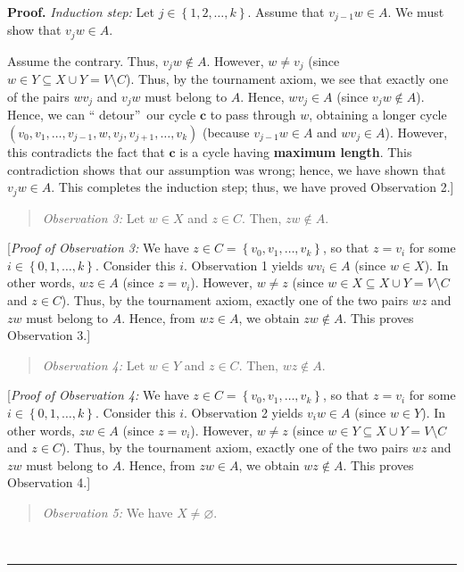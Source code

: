 \documentclass[numbers=enddot,12pt,final,onecolumn,notitlepage]{scrartcl}%
\numberwithin{exer}{subsection}
\theoremstyle{definition}
\newenvironment{statement}{\begin{quote}}{\end{quote}}
\newenvironment{proof}[1][Proof]{\noindent\textbf{#1.} }{\ \rule{0.5em}{0.5em}}
\begin{document}
\begin{proof}
\textit{Induction step:} Let $j\in\left\{  1,2,\ldots,k\right\}  $. Assume
that $v_{j-1}w\in A$. We must show that $v_{j}w\in A$.

Assume the contrary. Thus, $v_{j}w\notin A$. However, $w\neq v_{j}$ (since
$w\in Y\subseteq X\cup Y=V\setminus C$). Thus, by the tournament axiom, we see
that exactly one of the pairs $wv_{j}$ and $v_{j}w$ must belong to $A$. Hence,
$wv_{j}\in A$ (since $v_{j}w\notin A$). Hence, we can \textquotedblleft
detour\textquotedblright\ our cycle $\mathbf{c}$ to pass through $w$,
obtaining a longer cycle $\left(  v_{0},v_{1},\ldots,v_{j-1},w,v_{j}%
,v_{j+1},\ldots,v_{k}\right)  $ (because $v_{j-1}w\in A$ and $wv_{j}\in A$).
However, this contradicts the fact that $\mathbf{c}$ is a cycle having
\textbf{maximum length}. This contradiction shows that our assumption was
wrong; hence, we have shown that $v_{j}w\in A$. This completes the induction
step; thus, we have proved Observation 2.]

\begin{statement}
\textit{Observation 3:} Let $w\in X$ and $z\in C$. Then, $zw\notin A$.
\end{statement}

[\textit{Proof of Observation 3:} We have $z\in C=\left\{  v_{0},v_{1}%
,\ldots,v_{k}\right\}  $, so that $z=v_{i}$ for some $i\in\left\{
0,1,\ldots,k\right\}  $. Consider this $i$. Observation 1 yields $wv_{i}\in A$
(since $w\in X$). In other words, $wz\in A$ (since $z=v_{i}$). However, $w\neq
z$ (since $w\in X\subseteq X\cup Y=V\setminus C$ and $z\in C$). Thus, by the
tournament axiom, exactly one of the two pairs $wz$ and $zw$ must belong to
$A$. Hence, from $wz\in A$, we obtain $zw\notin A$. This proves Observation 3.]

\begin{statement}
\textit{Observation 4:} Let $w\in Y$ and $z\in C$. Then, $wz\notin A$.
\end{statement}

[\textit{Proof of Observation 4:} We have $z\in C=\left\{  v_{0},v_{1}%
,\ldots,v_{k}\right\}  $, so that $z=v_{i}$ for some $i\in\left\{
0,1,\ldots,k\right\}  $. Consider this $i$. Observation 2 yields $v_{i}w\in A$
(since $w\in Y$). In other words, $zw\in A$ (since $z=v_{i}$). However, $w\neq
z$ (since $w\in Y\subseteq X\cup Y=V\setminus C$ and $z\in C$). Thus, by the
tournament axiom, exactly one of the two pairs $wz$ and $zw$ must belong to
$A$. Hence, from $zw\in A$, we obtain $wz\notin A$. This proves Observation 4.]

\begin{statement}
\textit{Observation 5:} We have $X\neq\varnothing$.
\end{statement}


\end{proof}
\end{document}
